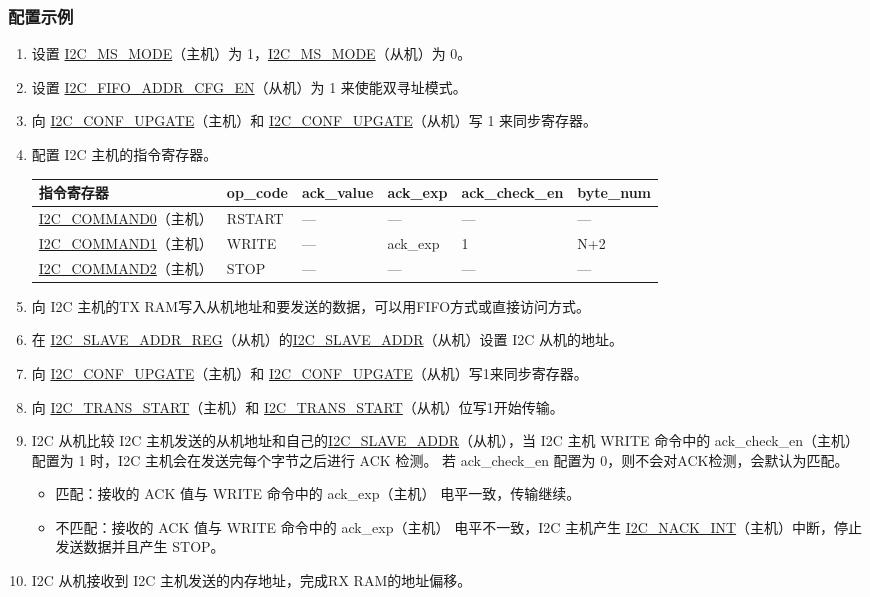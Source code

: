 \documentclass[main\_\_CN.tex]{subfiles}
\begin{document}
\subsubsection{配置示例}
\begin{enumerate}
\item 设置 \hyperref[fielddesc:I2CMSMODE]{I2C\_MS\_MODE}（主机）为 1，\hyperref[fielddesc:I2CMSMODE]{I2C\_MS\_MODE}（从机）为 0。
\item 设置 \hyperref[fielddesc:I2CFIFOADDRCFGEN]{I2C\_FIFO\_ADDR\_CFG\_EN}（从机）为 1 来使能双寻址模式。
\item 向 \hyperref[fielddesc:I2CCONFUPGATE]{I2C\_CONF\_UPGATE}（主机）和 \hyperref[fielddesc:I2CCONFUPGATE]{I2C\_CONF\_UPGATE}（从机）写 1 来同步寄存器。
\item 配置 I2C 主机的指令寄存器。
\begin{longtable}{ | p{4cm} | p{2cm} | p{2cm} | p{2cm} |p{2.2cm} | p{1.8cm} |}
\hline\rowcolor{lightgray}
指令寄存器& op\_code & ack\_value&ack\_exp&ack\_check\_en&byte\_num  \\ \hline
\hyperref[fielddesc:I2CCOMMAND0]{I2C\_COMMAND0}（主机）& RSTART& ---&---&---&---  \\ \hline
\hyperref[fielddesc:I2CCOMMAND1]{I2C\_COMMAND1}（主机）& WRITE& ---&ack\_exp&1&N+2  \\ \hline
\hyperref[fielddesc:I2CCOMMAND2]{I2C\_COMMAND2}（主机）& STOP& ---&---&---&---  \\ \hline
\end{longtable}
\item 向 I2C 主机的TX RAM写入从机地址和要发送的数据，可以用FIFO方式或直接访问方式。
\item 在 \hyperref[regdesc:I2CSLAVEADDRREG]{I2C\_SLAVE\_ADDR\_REG}（从机）的\hyperref[fielddesc:I2CSLAVEADDR]{I2C\_SLAVE\_ADDR}（从机）设置 I2C 从机的地址。
\item 向 \hyperref[fielddesc:I2CCONFUPGATE]{I2C\_CONF\_UPGATE}（主机）和 \hyperref[fielddesc:I2CCONFUPGATE]{I2C\_CONF\_UPGATE}（从机）写1来同步寄存器。
\item 向 \hyperref[fielddesc:I2CTRANSSTART]{I2C\_TRANS\_START}（主机）和 \hyperref[fielddesc:I2CTRANSSTART]{I2C\_TRANS\_START}（从机）位写1开始传输。
\item I2C 从机比较 I2C 主机发送的从机地址和自己的\hyperref[fielddesc:I2CSLAVEADDR]{I2C\_SLAVE\_ADDR}（从机），当 I2C 主机 WRITE 命令中的 ack\_check\_en（主机） 配置为 1 时，I2C 主机会在发送完每个字节之后进行 ACK 检测。 若 ack\_check\_en 配置为 0，则不会对ACK检测，会默认为匹配。
\begin{itemize}
\item 匹配：接收的 ACK 值与 WRITE 命令中的 ack\_exp（主机） 电平一致，传输继续。
\item 不匹配：接收的 ACK 值与 WRITE 命令中的 ack\_exp（主机） 电平不一致，I2C 主机产生 \hyperref[int:i2c-nack]{I2C\_NACK\_INT}（主机）中断，停止发送数据并且产生 STOP。
\end{itemize}
\item I2C 从机接收到 I2C 主机发送的内存地址，完成RX RAM的地址偏移。


\end{enumerate}
\end{document}
